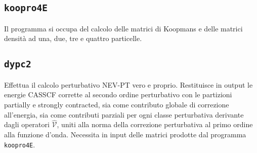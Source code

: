 \subsection{\texttt{koopro4E}}

Il programma si occupa del calcolo delle matrici di Koopmans e delle matrici
densit\`a ad una, due, tre e quattro particelle.

\subsection{\texttt{dypc2}}

Effettua il calcolo perturbativo NEV-PT vero e proprio. Restituisce in output
le energie CASSCF corrette al secondo ordine perturbativo con le partizioni
partially e strongly contracted, sia come contributo globale di
correzione all'energia, sia come contributi parziali per ogni classe perturbativa
derivante dagli operatori $\hat{\mathcal{V}}$, uniti alla norma della correzione
perturbativa al primo ordine alla funzione d'onda. 
Necessita in input delle matrici prodotte dal programma \texttt{koopro4E}.


